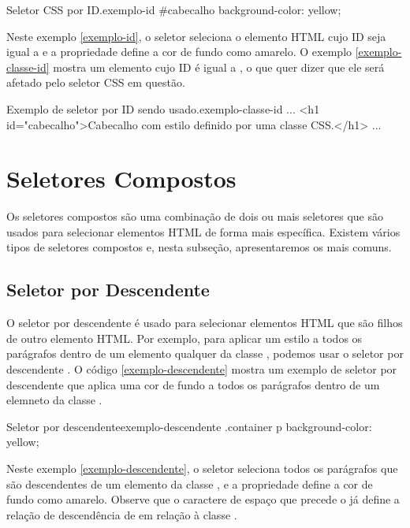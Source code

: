 \begin{csscode}{Seletor CSS por ID.}{exemplo-id}
#cabecalho {
    background-color: yellow;
}
\end{csscode}

Neste exemplo \ref{exemplo-id}, o seletor  seleciona o elemento HTML cujo ID seja igual a  e a propriedade  define a cor de fundo como amarelo. O exemplo \ref{exemplo-classe-id} mostra um elemento  cujo ID é igual a , o que quer dizer que ele será afetado pelo seletor CSS em questão.

\begin{htmlcode}{Exemplo de seletor por ID sendo usado.}{exemplo-classe-id}
...
<h1 id="cabecalho">Cabecalho com estilo definido por uma classe CSS.</h1>
...
\end{htmlcode}

\section{Seletores Compostos}

Os seletores compostos são uma combinação de dois ou mais seletores que são usados para selecionar elementos HTML de forma mais específica. Existem vários tipos de seletores compostos e, nesta subseção, apresentaremos os mais comuns.

\subsection{Seletor por Descendente}

O seletor por descendente é usado para selecionar elementos HTML que são filhos de outro elemento HTML. Por exemplo, para aplicar um estilo a todos os parágrafos dentro de um elemento qualquer da classe , podemos usar o seletor por descendente . O código \ref{exemplo-descendente} mostra um exemplo de seletor por descendente que aplica uma cor de fundo a todos os parágrafos dentro de um elemneto da classe .

\begin{csscode}{Seletor por descendente}{exemplo-descendente}
.container p {
    background-color: yellow;
}
\end{csscode}

Neste exemplo \ref{exemplo-descendente}, o seletor  seleciona todos os parágrafos que são descendentes de um elemento da classe , e a propriedade  define a cor de fundo como amarelo. Observe que o caractere de espaço que precede o  já define a relação de descendência de  em relação à classe .

